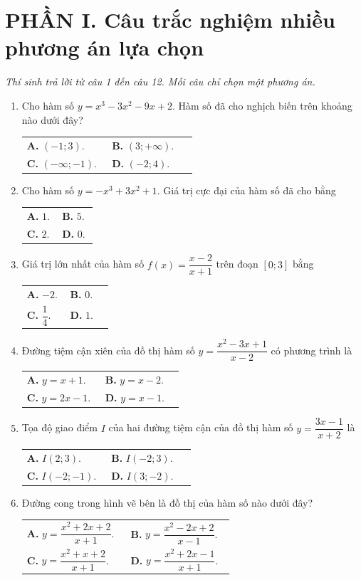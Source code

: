 \documentclass[12pt,a4paper]{article}
\makeatletter
\newcommand{\bonpa}[4]{\par\nobreak\smallskip\nobreak\noindent
\begin{tabular}{@{}p{0.47\linewidth}p{0.47\linewidth}@{}}
\textbf{A.} #1 & \textbf{B.} #2\\[8pt]
\textbf{C.} #3 & \textbf{D.} #4\end{tabular}}
\makeatother
\begin{document}
\section*{\large PHẦN I. Câu trắc nghiệm nhiều phương án lựa chọn}
\textit{Thí sinh trả lời từ câu 1 đến câu 12. Mỗi câu chỉ chọn một phương án.}
\begin{enumerate}
\item Cho hàm số $y=x^3-3x^2-9x+2$. Hàm số đã cho nghịch biến trên khoảng nào dưới đây?
\bonpa{$(-1;3)$.}{$(3;+\infty)$.}{$(-\infty;-1)$.}{$(-2;4)$.}

\item Cho hàm số $y=-x^3+3x^2+1$. Giá trị cực đại của hàm số đã cho bằng
\bonpa{$1$.}{$5$.}{$2$.}{$0$.}

\item Giá trị lớn nhất của hàm số $f(x)=\dfrac{x-2}{x+1}$ trên đoạn $[0;3]$ bằng
\bonpa{$-2$.}{$0$.}{$\dfrac{1}{4}$.}{$1$.}

\item Đường tiệm cận xiên của đồ thị hàm số $y=\dfrac{x^2-3x+1}{x-2}$ có phương trình là
\bonpa{$y=x+1$.}{$y=x-2$.}{$y=2x-1$.}{$y=x-1$.}

\item Tọa độ giao điểm $I$ của hai đường tiệm cận của đồ thị hàm số $y=\dfrac{3x-1}{x+2}$ là
\bonpa{$I(2;3)$.}{$I(-2;3)$.}{$I(-2;-1)$.}{$I(3;-2)$.}

\item Đường cong trong hình vẽ bên là đồ thị của hàm số nào dưới đây?
\par\nobreak\smallskip
\begin{minipage}[c]{0.62\linewidth}
\bonpa{$y=\dfrac{x^2+2x+2}{x+1}$.}{$y=\dfrac{x^2-2x+2}{x-1}$.}{$y=\dfrac{x^2+x+2}{x+1}$.}{$y=\dfrac{x^2+2x-1}{x+1}$.}
\end{minipage}\hfill
\begin{minipage}[c]{0.36\linewidth}\centering
{}
\end{minipage}
\end{enumerate}
\end{document}

